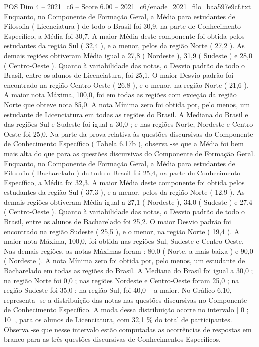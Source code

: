 \begin{textsample}{POS Dim 4 – 2021\_c6 – Score 6.00 – 2021\_c6/enade\_2021\_filo\_baa597e9cf.txt}
Enquanto, no Componente de Formação Geral, a Média para estudantes de Filosofia ( Licenciatura ) de todo o Brasil foi 30,9, na parte de Conhecimento Específico, a Média foi 30,7.
A maior Média deste componente foi obtida pelos estudantes da região Sul ( 32,4 ), e a menor, pelos da região Norte ( 27,2 ).
As demais regiões obtiveram Média igual a 27,8 ( Nordeste ), 31,9 ( Sudeste ) e 28,0 ( Centro-Oeste ).
Quanto à variabilidade das notas, o Desvio padrão de todo o Brasil, entre os alunos de Licenciatura, foi 25,1.
O maior Desvio padrão foi encontrado na região Centro-Oeste ( 26,8 ), e o menor, na região Norte ( 21,6 ).
A maior nota Máxima, 100,0, foi em todas as regiões com exceção da região Norte que obteve nota 85,0.
A nota Mínima zero foi obtida por, pelo menos, um estudante de Licenciatura em todas as regiões do Brasil.
A Mediana do Brasil e das regiões Sul e Sudeste foi igual a 30,0 ; e nas regiões Norte, Nordeste e Centro-Oeste foi 25,0.
Na parte da prova relativa às questões discursivas do Componente de Conhecimento Específico ( Tabela 6.17b ), observa -se que a Média foi bem mais alta do que para as questões discursivas do Componente de Formação Geral.
Enquanto, no Componente de Formação Geral, a Média para estudantes de Filosofia ( Bacharelado ) de todo o Brasil foi 25,4, na parte de Conhecimento Específico, a Média foi 32,3.
A maior Média deste componente foi obtida pelos estudantes da região Sul ( 37,3 ), e a menor, pelos da região Norte ( 12,9 ).
As demais regiões obtiveram Média igual a 27,1 ( Nordeste ), 34,0 ( Sudeste ) e 27,4 ( Centro-Oeste ).
Quanto à variabilidade das notas, o Desvio padrão de todo o Brasil, entre os alunos de Bacharelado foi 25,2.
O maior Desvio padrão foi encontrado na região Sudeste ( 25,5 ), e o menor, na região Norte ( 19,4 ).
A maior nota Máxima, 100,0, foi obtida nas regiões Sul, Sudeste e Centro-Oeste.
Nas demais regiões, as notas Máximas foram : 80,0 ( Norte, a mais baixa ) e 90,0 ( Nordeste ).
A nota Mínima zero foi obtida por, pelo menos, um estudante de Bacharelado em todas as regiões do Brasil.
A Mediana do Brasil foi igual a 30,0 ; na região Norte foi 0,0 ; nas regiões Nordeste e Centro-Oeste foram 25,0 ; na região Sudeste foi 35,0 ; na região Sul, foi 40,0 – a maior.
No Gráfico 6.10, representa -se a distribuição das notas nas questões discursivas no Componente de Conhecimento Específico.
A moda dessa distribuição ocorre no intervalo [ 0 ; 10 ], para os alunos de Licenciatura, com 32,1 \% do total de participantes.
Observa -se que nesse intervalo estão computadas as ocorrências de respostas em branco para as três questões discursivas de Conhecimentos Específicos.

\end{textsample}
